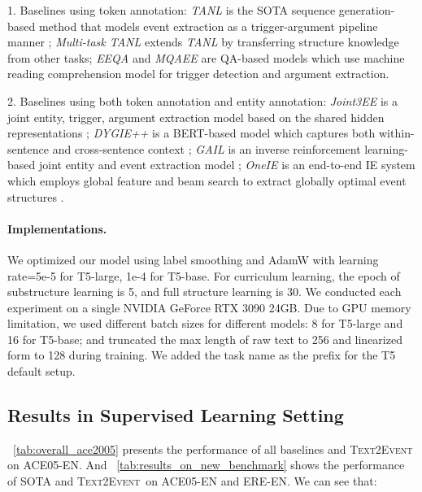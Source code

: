 \documentclass[11pt,a4paper]{article}
\newcommand\modelname{\textsc{Text2Event}}
\begin{document}
1. Baselines using token annotation:
\textit{TANL} is the SOTA sequence generation-based method that models event extraction as a trigger-argument pipeline manner \citep{paolini2021structured};
\textit{Multi-task TANL} extends \textit{TANL} by transferring structure knowledge from other tasks;
\textit{EEQA} \citep{du-cardie-2020-event} and \textit{MQAEE} \citep{li-etal-2020-event} are QA-based models which use machine reading comprehension model for trigger detection and argument extraction.

2. Baselines using both token annotation and entity annotation:
\textit{Joint3EE} is a joint entity, trigger, argument extraction model based on the shared hidden representations \citep{Nguyen-Nguyen:2019:AAAI2019};
\textit{DYGIE++} is a BERT-based model which captures both within-sentence and cross-sentence context \citep{wadden-etal-2019-entity};
\textit{GAIL} is an inverse reinforcement learning-based joint entity and event extraction model \citep{Zhang:2019:GAIL};
\textit{OneIE} is an end-to-end IE system which employs global feature and beam search to extract globally optimal event structures \citep{lin-etal-2020-joint}.

\paragraph{Implementations.}
We optimized our model using label smoothing \citep{7780677,MullerKH19} and AdamW \citep{loshchilov2018decoupled} with learning rate=5e-5 for T5-large, 1e-4 for T5-base.
For curriculum learning, the epoch of substructure learning is 5, and full structure learning is 30.
We conducted each experiment on a single NVIDIA GeForce RTX 3090 24GB.
Due to GPU memory limitation, we used different batch sizes for different models: 8 for T5-large and 16 for T5-base; and truncated the max length of raw text to 256 and linearized form to 128 during training.
We added the task name as the prefix for the T5 default setup.

\subsection{Results in Supervised Learning Setting} \label{sec:supervised_learning_results}


\tablename~\ref{tab:overall_ace2005} presents the performance of all baselines and \modelname\, on ACE05-EN.
And \tablename~\ref{tab:results_on_new_benchmark} shows the performance of SOTA and \modelname\, on ACE05-EN and ERE-EN.
We can see that:
\end{document}
